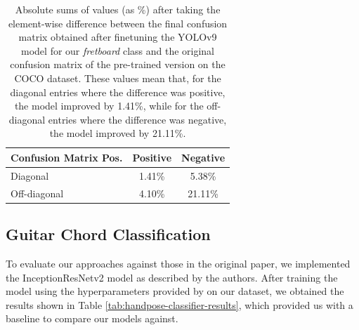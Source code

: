 \documentclass[10pt,twocolumn,letterpaper]{article}
\begin{document}
\begin{table}[h]
    \centering
    \begin{tabular}{lcc}
        \toprule
        \textbf{Confusion Matrix Pos.} & \textbf{Positive} & \textbf{Negative} \\
        \midrule
        Diagonal                       & 1.41\%            & 5.38\%            \\
        \midrule
        Off-diagonal                   & 4.10\%            & 21.11\%           \\
        \bottomrule
    \end{tabular}
    \caption{Absolute sums of values (as \%) after taking the element-wise difference between the final confusion matrix obtained after finetuning the YOLOv9 model for our \emph{fretboard} class and the original confusion matrix of the pre-trained version on the COCO dataset. These values mean that, for the diagonal entries where the difference was positive, the model improved by 1.41\%, while for the off-diagonal entries where the difference was negative, the model improved by 21.11\%.}
    \label{tab:confusion-matrix-results}
\end{table}



\subsection{Guitar Chord Classification}
To evaluate our approaches against those in the original paper, we implemented the InceptionResNetv2 model as described by the authors. After training the model using the hyperparameters provided by \cite{Kristian_Zaman_Tenoyo_Jodhinata_2024} on our dataset, we obtained the results shown in Table \ref{tab:handpose-classifier-results}, which provided us with a baseline to compare our models against.
\end{document}

